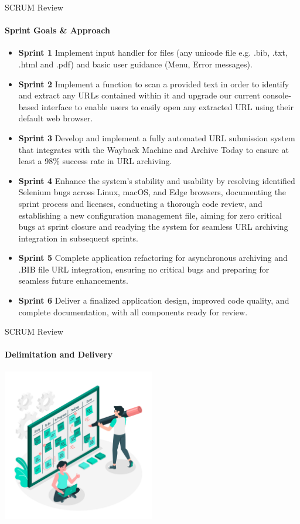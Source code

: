 \documentclass[
ngerman,%
authorontitle=true,
]{bfhbeamer}
\begin{document}
	\begin{frame}{SCRUM Review}
		\framesubtitle{Sprint Goals \& Approach}
		\begin{itemize}
			\item \textbf{Sprint 1} Implement input handler for files (any unicode file e.g. .bib, .txt, .html and .pdf) and basic user guidance (Menu, Error messages).
			\item \textbf{Sprint 2} Implement a function to scan a provided text in order to identify and extract any URLs contained within it and upgrade our current console-based interface to enable users to easily open any extracted URL using their default web browser.
			\item \textbf{Sprint 3} Develop and implement a fully automated URL submission system that integrates with the Wayback Machine and Archive Today to ensure at least a 98\% success rate in URL archiving.
			\item \textbf{Sprint 4} Enhance the system's stability and usability by resolving identified Selenium bugs across Linux, macOS, and Edge browsers, documenting the sprint process and licenses, conducting a thorough code review, and establishing a new configuration management file, aiming for zero critical bugs at sprint closure and readying the system for seamless URL archiving integration in subsequent sprints.
			\item \textbf{Sprint 5} Complete application refactoring for asynchronous archiving and .BIB file URL integration, ensuring no critical bugs and preparing for seamless future enhancements.
			\item \textbf{Sprint 6} Deliver a finalized application design, improved code quality, and complete documentation, with all components ready for review.
		\end{itemize}
	\end{frame}
	
	\begin{frame}{SCRUM Review}
		\framesubtitle{Delimitation and Delivery}
		\begin{center}
			\includegraphics[width=0.5\textwidth]{pictures/final_presentation/scrum board concept illustration}
		\end{center}
	\end{frame}
	
\end{document}
